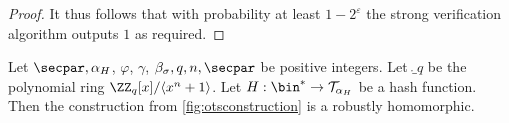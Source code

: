 \begin{proof}
%   
It thus follows that with probability at least $1-2^\varepsilon$ the strong verification algorithm outputs $1$ as required.
\end{proof}


\begin{lemma}\label{lem:kots_homomorphic}
  Let $\secpar, \alpha_H$, $\varphi$, $\gamma$, $\beta_\sigma,q,n,\secpar$ be positive integers.
  Let $\ring_q$ be the polynomial ring $\ZZ_q[x]/\langle x^n+1\rangle$.
  Let $H : \bin^* \to \tern_{\alpha_H}$ be a hash function.
  Then the construction from \autoref{fig:otsconstruction} is a robustly homomorphic.
\end{lemma}

